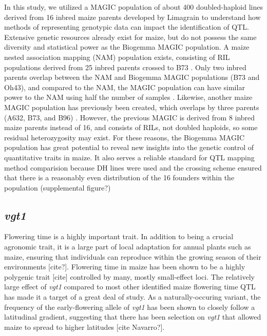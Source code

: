 \documentclass[article,9pt,twocolumn,twoside]{rilabRxiv}
\begin{document}
In this study, we utilized a MAGIC population of about 400 doubled-haploid lines derived from 16 inbred maize parents developed by Limagrain to understand how methods of representing genotypic data can impact the identification of QTL. Extensive genetic resources already exist for maize, but do not possess the same diversity and statistical power as the Biogemma MAGIC population. A maize nested association mapping (NAM) population exists, consisting of RIL populations derived from 25 inbred parents crossed to B73 \citep{RN11}.  Only two inbred parents overlap between the NAM and Biogemma MAGIC populations (B73 and Oh43), and compared to the NAM, the MAGIC population can have similar power to the NAM using half the number of samples \citep{RN4}. Likewise, another maize MAGIC population has previously been created, which overlaps by three parents (A632, B73, and B96) \citep{RN4}. However, the previous MAGIC is derived from 8 inbred maize parents instead of 16, and consists of RILs, not doubled haploids, so some residual heterozygosity may exist.  For these reasons, the Biogemma MAGIC population has great potential to reveal new insights into the genetic control of quantitative traits in maize. It also serves a reliable standard for QTL mapping method comparision because DH lines were used and the crossing scheme ensured that there is a reasonably even distribution of the 16 founders within the population (supplemental figure?)

\subsection{\emph{vgt1}}
Flowering time is a highly important trait. In addition to being a crucial agronomic trait, it is a large part of local adaptation for annual plants such as maize, ensuring that individuals can reproduce within the growing season of their environments [cite?]. Flowering time in maize has been shown to be a highly polygenic trait [cite] controlled by many, mostly small-effect loci. The relatively large effect of \emph{vgt1} compared to most other identified maize flowering time QTL has made it a target of a great deal of study. As a naturally-occuring variant, the frequency of the early-flowering allele of \emph{vgt1} has been shown to closely follow a latitudinal gradient, suggesting that there has been selection on \emph{vgt1} that allowed maize to spread to higher latitudes [cite Navarro?].
\end{document}
